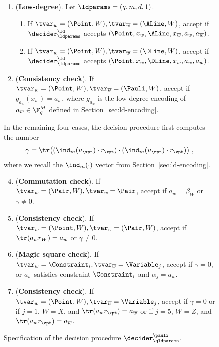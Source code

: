 \begin{figure}[H]
\begin{gamespec}
\begin{enumerate}[itemsep=2pt,parsep=2pt]
    \item (\textbf{Low-degree}).
      \label{item:low-degree}
      Let $\ldparams = (q,m,d,1)$. 
      \begin{enumerate}
      	\item If $\tvar_w = (\Point, W), \tvar_{\overline{w}} = (\ALine, W)$, accept if
      $\decider^\ld_{\ldparams}$ accepts $(\Point, x_w, \ALine, x_{\overline{w}}, a_w,
      a_{\overline{w}})$.
      	\item If $\tvar_w = (\Point, W), \tvar_{\overline{w}} = (\DLine, W)$, accept if
      $\decider^\ld_{\ldparams}$ accepts $(\Point, x_w, \DLine, x_{\overline{w}}, a_w,
      a_{\overline{w}})$.
		\end{enumerate}
    \item (\textbf{Consistency check}).
      \label{item:low-degree-consistency}
      If $\tvar_w = (\Point, W), \tvar_{\overline{w}} = (\Pauli, W)$, accept if
      $g_{a_{\overline{w}}}(x_w) = a_w$, where $g_{a_{\overline{w}}}$ is
      the low-degree encoding of $a_{\overline{w}} \in \F_q^M$ defined in
      Section~\ref{sec:ld-encoding}.
    \end{enumerate}
    In the remaining four cases, the decision procedure first computes the
    number
    \begin{equation}
      \label{eq:gamma-value}
      \gamma = \tr \bigl( (\ind_{m}(u_\xpt) \cdot r_\xpt) \cdot
      (\ind_{m}(u_\zpt) \cdot r_\zpt) \bigr)\;,
    \end{equation}
    where we recall the $\ind_{m}(\cdot)$ vector from Section~\ref{sec:ld-encoding}.
    \begin{enumerate}[itemsep=2pt,parsep=2pt]
      \setcounter{enumi}{3}
    \item (\textbf{Commutation check}).
      \label{item:commutation} If $\tvar_w = (\Pair, W), \tvar_{\overline{w}} =
      \Pair$, accept if $a_w = \beta_W$ or $\gamma \neq 0$.
    \item (\textbf{Consistency check}).
      \label{item:commutation-consistency} If $\tvar_w = (\Point,W), \tvar_{\overline{w}} =
      (\Pair,W)$, accept if $\tr (a_w r_W) = a_{\overline{w}}$ or $\gamma \neq 0$.
      
    \item (\textbf{Magic square check}).
      \label{item:magic-square} If $\tvar_w = \Constraint_i,
      \tvar_{\overline{w}} = \Variable_j$, accept if $\gamma = 0$, or $a_w$
      satisfies constraint $\Constraint_i$ and $ \alpha_j = a_{\overline{w}}$.

    \item (\textbf{Consistency check}).
      \label{item:magic-square-consistency}
      If $\tvar_w = (\Point,W), \tvar_{\overline{w}} = \Variable_j$, accept if
      $\gamma = 0$ or if $j = 1$, $W = X$, and $\tr(a_w r_\xpt) =
      a_{\overline{w}}$ or if $j = 5$, $W = Z$, and $\tr(a_w r_\zpt) =
      a_{\overline{w}}$.
    \end{enumerate}
  \end{gamespec}
  \caption{Specification of the decision procedure $\decider^\pauli_\qldparams$.}
  \label{fig:decider_pauli}
\end{figure}

